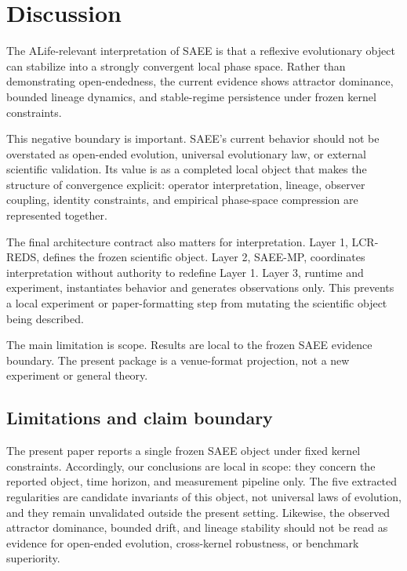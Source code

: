 \section{Discussion}

The ALife-relevant interpretation of SAEE is that a reflexive evolutionary
object can stabilize into a strongly convergent local phase space. Rather than
demonstrating open-endedness, the current evidence shows attractor dominance,
bounded lineage dynamics, and stable-regime persistence under frozen kernel
constraints.

This negative boundary is important. SAEE's current behavior should not be
overstated as open-ended evolution, universal evolutionary law, or external
scientific validation. Its value is as a completed local object that makes the
structure of convergence explicit: operator interpretation, lineage, observer
coupling, identity constraints, and empirical phase-space compression are
represented together.

The final architecture contract also matters for interpretation. Layer 1,
LCR-REDS, defines the frozen scientific object. Layer 2, SAEE-MP, coordinates
interpretation without authority to redefine Layer 1. Layer 3, runtime and
experiment, instantiates behavior and generates observations only. This
prevents a local experiment or paper-formatting step from mutating the
scientific object being described.

The main limitation is scope. Results are local to the frozen SAEE evidence
boundary. The present package is a venue-format projection, not a new
experiment or general theory.

\subsection*{Limitations and claim boundary}

The present paper reports a single frozen SAEE object under fixed kernel
constraints. Accordingly, our conclusions are local in scope: they concern the
reported object, time horizon, and measurement pipeline only. The five
extracted regularities are candidate invariants of this object, not universal
laws of evolution, and they remain unvalidated outside the present setting.
Likewise, the observed attractor dominance, bounded drift, and lineage
stability should not be read as evidence for open-ended evolution,
cross-kernel robustness, or benchmark superiority.

